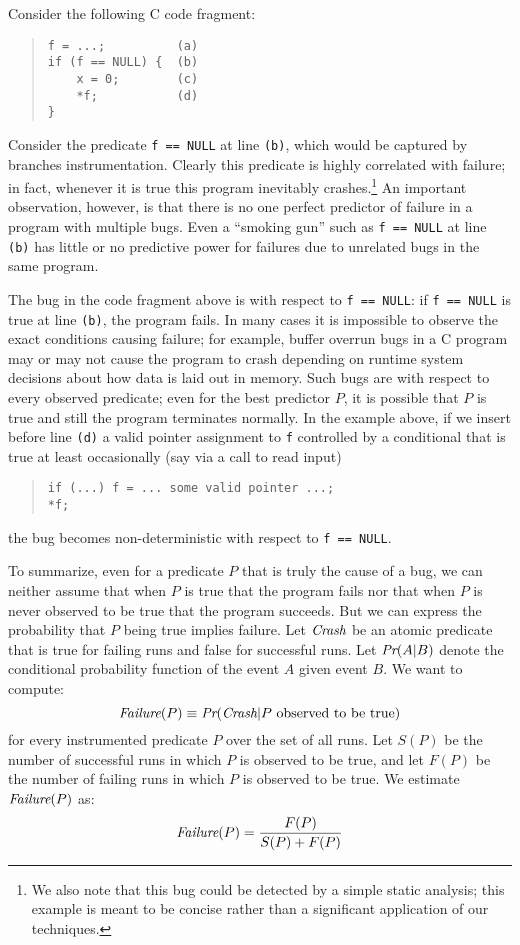 Consider the following C code fragment:
\begin{quote}
\begin{verbatim}
f = ...;          (a)
if (f == NULL) {  (b)
    x = 0;        (c)
    *f;           (d)
}
\end{verbatim}
\end{quote}
Consider the predicate \texttt{f == NULL} at line \texttt{(b)}, which would
be captured by branches instrumentation.  Clearly
this predicate is highly correlated with failure; in fact, whenever it
is true this program inevitably crashes.\footnote{We also note that this bug could
be detected by a simple static analysis; this example is meant to be concise rather than
a significant application of our techniques.}   An important observation,
however, is that there is no one perfect predictor of failure in a
program with multiple bugs.  Even a ``smoking gun'' such as \texttt{f ==
  NULL} at line \texttt{(b)} has little or no predictive power for
failures due to unrelated bugs in the same program.

The bug in the code fragment above is  with
respect to \texttt{f == NULL}: if \texttt{f == NULL} is true at line
\texttt{(b)}, the program fails.  In many cases it is impossible to observe
the exact conditions causing failure; for example, buffer overrun bugs
in a C program may or may not cause the program to crash depending on
runtime system decisions about how data is laid out in memory.  Such
bugs are  with respect to every observed predicate;
even for the best predictor $P$, it is possible
that $P$ is true and still the program terminates normally.  In the
example above, if we insert before line \texttt{(d)} a valid pointer
assignment to \texttt{f} controlled by a conditional that is true at
least occasionally (say via a call to read input)
\begin{quote}
\begin{verbatim}
if (...) f = ... some valid pointer ...;
*f;
\end{verbatim}
\end{quote}
the bug becomes non-deterministic with respect to \texttt{f == NULL}.

To summarize, even for a predicate $P$ that is truly the cause of a bug, we can neither assume that
when $P$ is true that
the program fails nor that when $P$ is never observed to be true  that
the program succeeds.
But we can express the probability that $P$
being true implies failure.  Let $\textit{Crash}$ be an atomic predicate that is
true for failing runs and false for successful runs.  Let $\textit{Pr}(A | B)$ denote
the conditional probability function of the event $A$ given event $B$.
We want to compute:
\[ \textit{Failure}(P) \equiv \textit{Pr}(\textit{Crash} | \text{$P$ observed to be true}) \]
for every instrumented predicate $P$ over the set of all runs.  Let $S(P)$ be the number
of successful runs in which $P$ is observed to be true, and let $F(P)$ be the number of
failing runs in which $P$ is observed to be true.
We estimate $\textit{Failure}(P)$ as:
\[ \textit{Failure}(P) = \frac{F(P)}{S(P) + F(P)} \]

